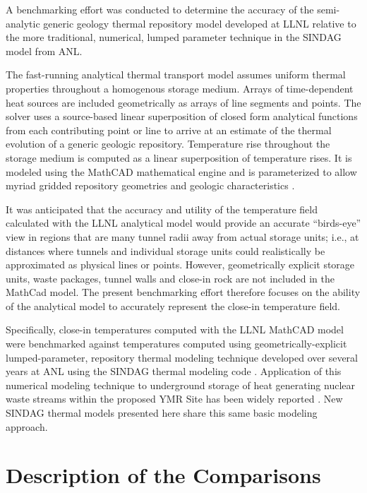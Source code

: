 
A benchmarking effort was conducted to determine the accuracy of the 
semi-analytic generic geology thermal repository model developed at 
\gls{LLNL}\cite{hardin_generic_2011,sutton_investigations_2011,greenberg_application_2012} 
relative to the more traditional, numerical, lumped parameter technique in the 
\gls{SINDAG} model from \gls{ANL}.

The fast-running analytical thermal transport model assumes uniform thermal 
properties throughout a homogenous storage medium. Arrays of time-dependent heat 
sources are included geometrically as arrays of line segments and points.  The 
solver uses a source-based linear superposition of closed form analytical 
functions from each contributing point or line to arrive at an estimate of the 
thermal evolution of a generic geologic repository.  Temperature rise throughout 
the storage medium is computed as a linear superposition of temperature rises.  
It is modeled using the MathCAD mathematical engine and is parameterized to 
allow myriad gridded repository geometries and geologic characteristics 
\cite{ptc_mathcad_2010}.

It was anticipated that the accuracy and utility of the temperature field
calculated with the \gls{LLNL} analytical model would provide an accurate 
``birds-eye''
view in regions that are many tunnel radii away from actual storage units;
i.e., at distances where tunnels and individual storage units could
realistically be approximated as physical lines or points. 
However, geometrically explicit storage units, waste packages, tunnel
walls and close-in rock are not included in the MathCad model. 
The present benchmarking effort therefore focuses on the ability of the 
analytical model to accurately represent the close-in
temperature field.

Specifically, close-in temperatures computed with the \gls{LLNL} MathCAD model 
were benchmarked against temperatures computed using geometrically-explicit 
lumped-parameter, repository thermal modeling technique developed over several 
years at \gls{ANL} using the \gls{SINDAG} thermal modeling code 
\cite{gaski_sinda_1987}. Application of this numerical modeling technique to 
underground storage of heat generating nuclear waste streams within the proposed 
\gls{YMR} Site has been widely reported \cite{wigeland_separations_2006}.  New 
\gls{SINDAG} thermal models presented here share this same basic modeling 
approach. 

\section{Description of the Comparisons}

